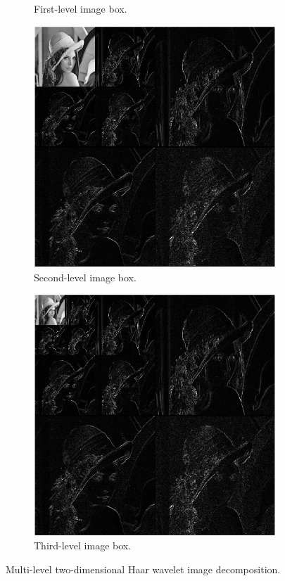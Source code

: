 \documentclass[12pt]{article}
\theoremstyle{definition}
\begin{document}
\begin{figure}
\begin{subfigure}{.48\textwidth}
      \caption{First-level image box.}
      \label{fig:lena-dec-1}
    \end{subfigure}
    \begin{subfigure}{.48\textwidth}
      \includegraphics[width=.99\textwidth]{figs/lena-dec-2.png}
      \caption{Second-level image box.}
      \label{fig:lena-dec-2}
    \end{subfigure}
    \begin{subfigure}{.48\textwidth}
      \includegraphics[width=.99\textwidth]{figs/lena-dec-3.png}
      \caption{Third-level image box.}
      \label{fig:lena-dec-3}
    \end{subfigure}
    \caption{Multi-level two-dimensional Haar wavelet image decomposition.}
    \label{fig:lena-dec}
  \end{figure}
\end{document}
